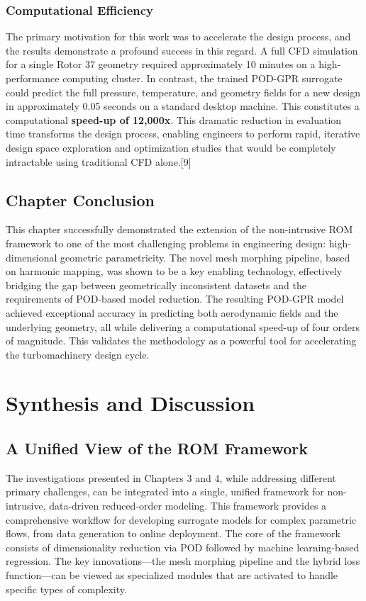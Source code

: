 \documentclass[12pt, a4paper]{report}
\begin{document}
\subsection{Computational Efficiency}
The primary motivation for this work was to accelerate the design process, and the results demonstrate a profound success in this regard. A full CFD simulation for a single Rotor 37 geometry required approximately 10 minutes on a high-performance computing cluster. In contrast, the trained POD-GPR surrogate could predict the full pressure, temperature, and geometry fields for a new design in approximately 0.05 seconds on a standard desktop machine. This constitutes a computational \textbf{speed-up of 12,000x}. This dramatic reduction in evaluation time transforms the design process, enabling engineers to perform rapid, iterative design space exploration and optimization studies that would be completely intractable using traditional CFD alone.[9]

\section{Chapter Conclusion}
This chapter successfully demonstrated the extension of the non-intrusive ROM framework to one of the most challenging problems in engineering design: high-dimensional geometric parametricity. The novel mesh morphing pipeline, based on harmonic mapping, was shown to be a key enabling technology, effectively bridging the gap between geometrically inconsistent datasets and the requirements of POD-based model reduction. The resulting POD-GPR model achieved exceptional accuracy in predicting both aerodynamic fields and the underlying geometry, all while delivering a computational speed-up of four orders of magnitude. This validates the methodology as a powerful tool for accelerating the turbomachinery design cycle.

\chapter{Synthesis and Discussion}

\section{A Unified View of the ROM Framework}
The investigations presented in Chapters 3 and 4, while addressing different primary challenges, can be integrated into a single, unified framework for non-intrusive, data-driven reduced-order modeling. This framework provides a comprehensive workflow for developing surrogate models for complex parametric flows, from data generation to online deployment. The core of the framework consists of dimensionality reduction via POD followed by machine learning-based regression. The key innovations—the mesh morphing pipeline and the hybrid loss function—can be viewed as specialized modules that are activated to handle specific types of complexity.
\end{document}
